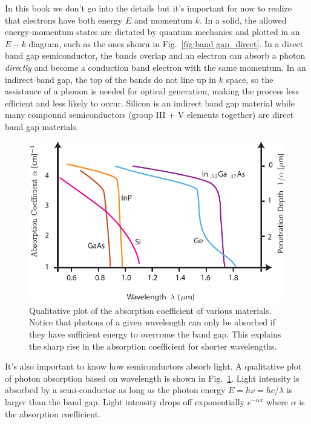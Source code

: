 In this book we don't go into the details but it's important for now to realize that electrons have both energy $E$ and momentum $k$.  In a solid, the allowed energy-momentum states are dictated by quantum mechanics and plotted in an $E-k$ diagram, such as the ones shown in Fig.~\ref{fig:band gap_direct}.  In a direct band gap semiconductor, the bands overlap and an electron can absorb a photon \emph{directly} and become a conduction band electron with the same momentum.   In an indirect band gap, the top of the bands do not line up in $k$ space, so the assistance of a phonon is needed for optical generation, making the process less efficient and less likely to occur.  Silicon is an indirect band gap material while many compound semiconductors (group III + V elements together) are direct band gap materials.
 

\begin{figure}[tb]
\begin{center}
\includegraphics[width=.75\columnwidth]{semi_absorb_photon}
\end{center}
\caption{Qualitative plot of the absorption coefficient of various materials.  Notice that photons of a given wavelength can only be absorbed if they have sufficient energy to overcome the band gap.  This explains the sharp rise in the absorption coefficient for shorter wavelengths.} \label{fig:semi_absorb_photon}
\end{figure}

It's also important to know how semiconductors absorb light.  A qualitative plot of photon absorption based on wavelength is shown in Fig.~\ref{fig:semi_absorb_photon}.  Light intensity is absorbed by a semi-conductor as long as the photon energy $E = h\nu = hc/\lambda $ is larger than the band gap.   Light intensity drops off exponentially $e^{-\alpha x}$ where $\alpha$ is the absorption coefficient.  
 


